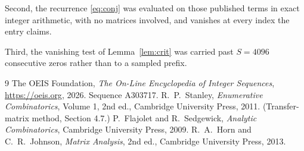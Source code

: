 \documentclass[11pt,a4paper]{article}
\theoremstyle{plain}
\theoremstyle{definition}
\begin{document}
Second, the recurrence \eqref{eq:conj} was evaluated on those published terms in exact
integer arithmetic, with no matrices involved, and vanishes at every index the entry claims.

Third, the vanishing test of Lemma~\ref{lem:crit} was carried past $S=4096$ consecutive
zeros rather than to a sampled prefix.

\begin{thebibliography}{9}
 The OEIS Foundation, \emph{The On-Line Encyclopedia of Integer
Sequences}, \url{https://oeis.org}, 2026. Sequence A303717.
 R.~P.~Stanley, \emph{Enumerative Combinatorics}, Volume 1, 2nd ed.,
Cambridge University Press, 2011. (Transfer-matrix method, Section 4.7.)
 P.~Flajolet and R.~Sedgewick, \emph{Analytic Combinatorics}, Cambridge
University Press, 2009.
 R.~A.~Horn and C.~R.~Johnson, \emph{Matrix Analysis}, 2nd ed., Cambridge
University Press, 2013.
\end{thebibliography}
\end{document}
